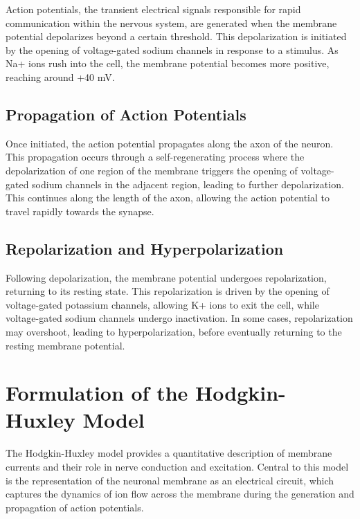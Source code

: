 \documentclass[12pt,a4paper]{report}
\begin{document}
Action potentials, the transient electrical signals responsible for rapid communication within the nervous system, are generated when the membrane potential depolarizes beyond a certain threshold. This depolarization is initiated by the opening of voltage-gated sodium channels in response to a stimulus. As Na+ ions rush into the cell, the membrane potential becomes more positive, reaching around +40 mV.

\subsection{Propagation of Action Potentials}

Once initiated, the action potential propagates along the axon of the neuron. This propagation occurs through a self-regenerating process where the depolarization of one region of the membrane triggers the opening of voltage-gated sodium channels in the adjacent region, leading to further depolarization. This continues along the length of the axon, allowing the action potential to travel rapidly towards the synapse.

\subsection{Repolarization and Hyperpolarization}

Following depolarization, the membrane potential undergoes repolarization, returning to its resting state. This repolarization is driven by the opening of voltage-gated potassium channels, allowing K+ ions to exit the cell, while voltage-gated sodium channels undergo inactivation. In some cases, repolarization may overshoot, leading to hyperpolarization, before eventually returning to the resting membrane potential\cite{principles_of_neural_science}.

\section{Formulation of the Hodgkin-Huxley Model}

The Hodgkin-Huxley model provides a quantitative description of membrane currents and their role in nerve conduction and excitation. Central to this model is the representation of the neuronal membrane as an electrical circuit, which captures the dynamics of ion flow across the membrane during the generation and propagation of action potentials.
\end{document}
